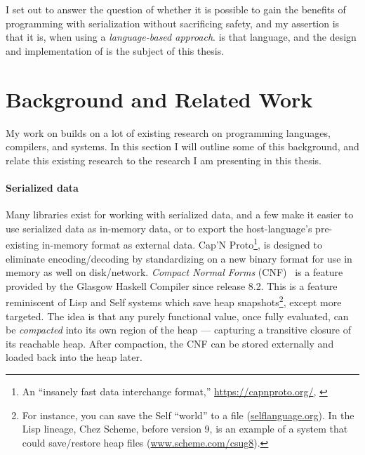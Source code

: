 I set out to answer the question of whether it is possible to gain the benefits
of programming with serialization without sacrificing safety, and my assertion
is that it is, when using a \emph{language-based approach}. \ourcalc{} is that
language, and the design and implementation of \ourcalc{} is the subject of this
thesis.

\section{Background and Related Work}\label{sec:bg}

My work on \ourcalc{} builds on a lot of existing research on programming languages,
compilers, and systems. In this section I will outline some of this background, and
relate this existing research to the research I am presenting in this thesis.

\paragraph{Serialized data}

Many libraries exist for working with serialized data, and a few
make it easier to use serialized data as in-memory data, or to export the
host-language's pre-existing in-memory format as external data.
Cap'N Proto\footnote{An ``insanely fast data interchange format,''
  \url{https://capnproto.org/}, \cite{capnproto}},
is designed to eliminate encoding/decoding by
standardizing on a new binary format for use in memory as well on disk/network.
%
%
\emph{Compact Normal Forms} (CNF)~\cite{cnf-icfp15} is
a feature provided by the Glasgow Haskell Compiler since release 8.2.
%
This is a
feature reminiscent of Lisp and Self systems which save heap snapshots\footnote{For
  instance, you can save the Self ``world'' to a  file (\url{selflanguage.org}).  In the Lisp lineage, Chez
  Scheme, before version 9, is an example of a system that could save/restore heap
  files (\url{www.scheme.com/csug8}).},
%
except more targeted.
%
The idea is that any purely functional value, once fully evaluated, can be \emph{compacted}
into its own region of the heap
--- capturing a transitive closure of its reachable heap.
After compaction, the CNF can be stored externally and loaded
back into the heap later.

